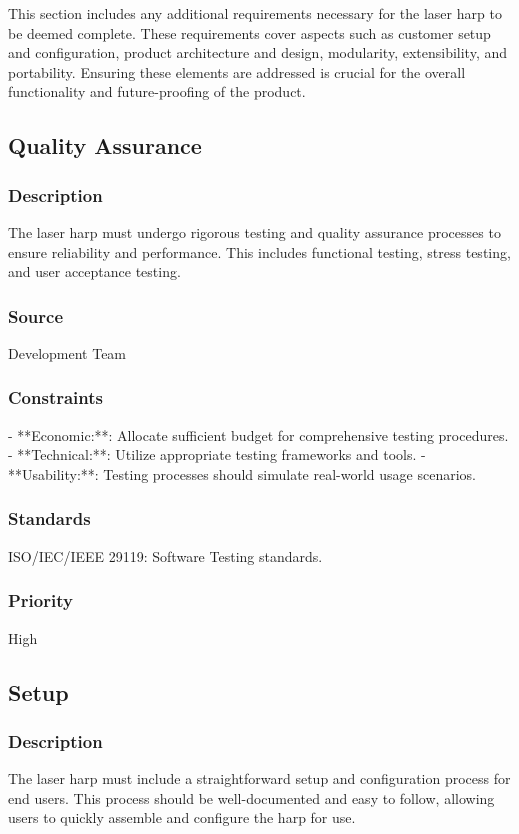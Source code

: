 This section includes any additional requirements necessary for the laser harp to be deemed complete. These requirements cover aspects such as customer setup and configuration, product architecture and design, modularity, extensibility, and portability. Ensuring these elements are addressed is crucial for the overall functionality and future-proofing of the product.


\subsection{Quality Assurance}
\subsubsection{Description}
The laser harp must undergo rigorous testing and quality assurance processes to ensure reliability and performance. This includes functional testing, stress testing, and user acceptance testing.
\subsubsection{Source}
Development Team
\subsubsection{Constraints}
- **Economic:**: Allocate sufficient budget for comprehensive testing procedures.
- **Technical:**: Utilize appropriate testing frameworks and tools.
- **Usability:**: Testing processes should simulate real-world usage scenarios.
\subsubsection{Standards}
ISO/IEC/IEEE 29119: Software Testing standards.
\subsubsection{Priority}
High


\subsection{Setup}
\subsubsection{Description}
The laser harp must include a straightforward setup and configuration process for end users. This process should be well-documented and easy to follow, allowing users to quickly assemble and configure the harp for use.
